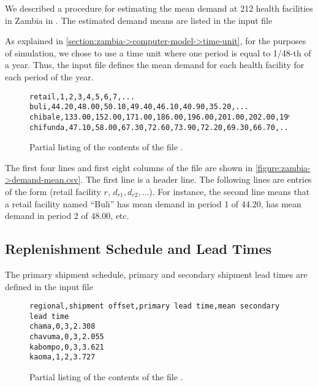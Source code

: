 We described a procedure for estimating the mean demand at
212 health facilities in Zambia
in \citet{gallien-leung-yadav-2014}.
The estimated demand means are listed in the input file
\begin{quote}
\end{quote}
As explained in \autoref{section:zambia->computer-model->time-unit},
for the purposes of simulation,
we chose to use a time unit where one period is equal to 1/48-th of a year.
Thus, the input file defines the mean demand
for each health facility for each period of the year.

\begin{figure}[h!]
\begin{lstlisting}
retail,1,2,3,4,5,6,7,...
buli,44.20,48.00,50.10,49.40,46.10,40.90,35.20,...
chibale,133.00,152.00,171.00,186.00,196.00,201.00,202.00,199.00,...
chifunda,47.10,58.00,67.30,72.60,73.90,72.20,69.30,66.70,...
\end{lstlisting}
\caption{Partial listing of the contents of
the file \protect{}.}
\label{figure:zambia->demand-mean.csv}
\end{figure}

The first four lines and first eight columns of the file are shown
in \autoref{figure:zambia->demand-mean.csv}.
The first line is a header line.
The following lines are entries of the form
(retail facility $r$, $d_{r1}, d_{r2}, \ldots$).
For instance, the second line means that a retail facility named ``Buli''
has mean demand in period 1 of 44.20,
has mean demand in period 2 of 48.00,
etc.




\subsection{Replenishment Schedule and Lead Times}

The primary shipment schedule,
primary and secondary shipment lead times
are defined in the input file
\begin{quote}
\end{quote}

\begin{figure}[h!]
\begin{lstlisting}
regional,shipment offset,primary lead time,mean secondary lead time
chama,0,3,2.308
chavuma,0,3,2.055
kabompo,0,3,3.621
kaoma,1,2,3.727
\end{lstlisting}
\caption{Partial listing of the contents of
the file \protect{}.}
\label{figure:zambia->replenishment.csv}
\end{figure}

